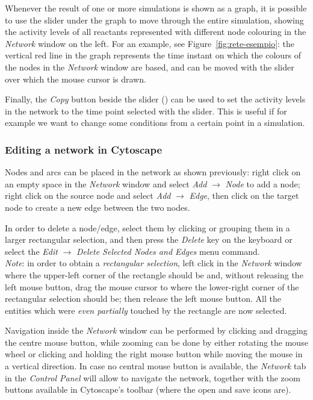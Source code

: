 \documentclass{article}
\newcommand{\copysymbol}{\raisebox{-0.8ex}{\pgfuseimage{copy-icon}}}
\begin{document}
Whenever the result of one or more simulations is shown as a graph, it is possible to use the slider under the graph to
move through the entire simulation, showing the activity levels of all reactants represented with different node colouring in
the \emph{Network} window on the left. For an example, see Figure~\ref{fig:rete-esempio}: the vertical red line in the
graph represents the time instant on which the colours of the nodes in the \emph{Network} window are based, and can
be moved with the slider over which the mouse cursor is drawn.

Finally, the \emph{Copy} button beside the slider (\copysymbol) can be used to set the activity levels in the network to the time point
selected with the slider. This is useful if for example we want to change some conditions from a certain point in a simulation.



\subsubsection{Editing a network in Cytoscape}
Nodes and arcs can be placed in the network as shown previously: right click on an empty space
in the \emph{Network} window and select \emph{Add} $\rightarrow$ \emph{Node} to add a node;
right click on the source node and select \emph{Add} $\rightarrow$ \emph{Edge}, then click on
the target node to create a new edge between the two nodes.

In order to delete a node/edge, select them by clicking
or grouping them in a larger rectangular selection, and then press the \emph{Delete} key on the keyboard
or select the \emph{Edit} $\rightarrow$ \emph{Delete Selected Nodes and Edges} menu command.\\
\emph{Note}: in order to obtain a \emph{rectangular selection}\label{nota:rectangular-selection},
left click in the \emph{Network} window where the upper-left corner of the rectangle should be and,
without releasing the left mouse button, drag the mouse cursor to where the lower-right corner of the
rectangular selection should be; then release the left mouse button. All the entities which were
\emph{even partially} touched by the rectangle are now selected.

Navigation inside the \emph{Network} window can be performed by clicking and dragging the centre mouse button,
while zooming can be done by either rotating the mouse wheel or clicking and holding the right mouse button
while moving the mouse in a vertical direction. In case no central mouse button is available, the \emph{Network}
tab in the \emph{Control Panel} will allow to navigate the network, together with the zoom buttons available in
Cytoscape's toolbar (where the open and save icons are).
\end{document}
